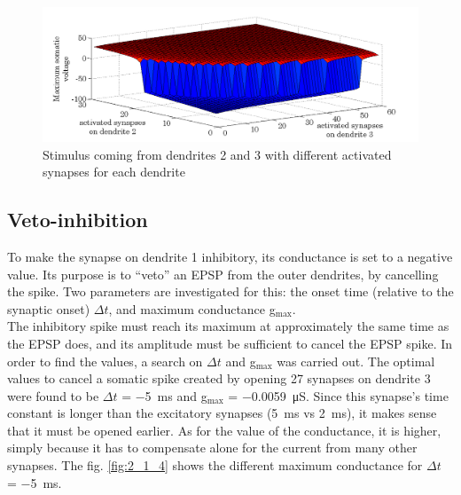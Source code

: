 \documentclass[a4paper, 10pt, conference]{ieeeconf}      %
\begin{document}
\begin{figure}
\begin{center}
\includegraphics[width=\columnwidth]{../figures/2_2.png}
\end{center}
\label{fig:2_1_3}
\caption{Stimulus coming from dendrites 2 and 3 with different activated synapses for each dendrite}
\end{figure}

\subsection{Veto-inhibition} \label{sec:veto}
To make the synapse on dendrite 1 inhibitory, its conductance is set to a negative value. Its purpose is to “veto” an EPSP from the outer dendrites, by cancelling the spike. Two parameters are investigated for this: the onset time (relative to the synaptic onset) $\Delta t$, and maximum conductance g$_\text{max}$. \\

The inhibitory spike must reach its maximum at approximately the same time as the EPSP does, and its amplitude must be sufficient to cancel the EPSP spike. In order to find the values, a search on $\Delta t$ and g$_\text{max}$ was carried out. The optimal values to cancel a somatic spike created by opening 27 synapses on dendrite 3 were found to be $\Delta t$ = \SI{-5}{\milli\second} and g$_\text{max}$ = \SI{-0.0059}{\micro\siemens}. Since this synapse’s time constant is longer than the excitatory synapses (\SI{5}{\milli\second} vs \SI{2}{\milli\second}), it makes sense that it must be opened earlier. As for the value of the conductance, it is higher, simply because it has to compensate alone for the current from many other synapses. The fig. \ref{fig:2_1_4} shows the different maximum conductance for $\Delta t$ = \SI{-5}{\milli\second}.  \\
\end{document}
